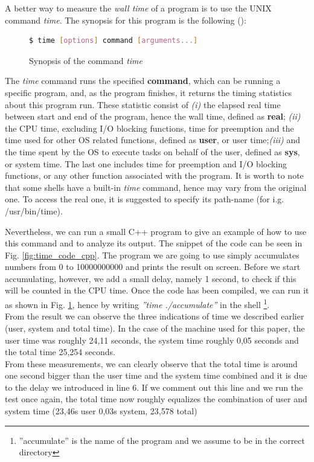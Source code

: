 A better way to measure the \textit{wall time} of a program is to use the UNIX command \textit{time}. The synopsis for this program is the following (\cite{linux_commands}):\\
\begin{figure}[h]
\begin{lstlisting}[language=bash]
   $ time [options] command [arguments...]
\end{lstlisting}
\caption{Synopsis of the command \textit{time}}
\label{fig:time_code}
\end{figure}


The \textit{time} command runs the specified \textbf{command}, which can be running a specific program, and, as the program finishes, it returns the timing statistics about this program run.
These statistic consist of \textit{(i)} the elapsed real time between start and end of the program, hence the wall time, defined as \textbf{real}; \textit{(ii)} the CPU time, excluding I/O blocking functions, time for preemption and the time used for other OS related functions, defined as \textbf{user}, or user time;\textit{(iii)} and the time spent by the OS to execute tasks on behalf of the user, defined as \textbf{sys}, or system time. The last one includes time for preemption and I/O blocking functions, or any other function associated with the program. \cite{Stewart2001MeasuringET}
It is worth to note that some shells have a built-in \textit{time} command, hence may vary from the original one. To access the real one, it is suggested to specify its path-name (for i.g. /usr/bin/time). \cite{linux_commands} 

Nevertheless, we can run a small C++ program to give an example of how to use this command and to analyze its output. The snippet of the code can be seen in Fig. \ref{fig:time_code_cpp}. The program we are going to use simply accumulates numbers from 0 to 10000000000 and prints the result on screen. Before we start accumulating, however, we add a small delay, namely 1 second, to check if this will be counted in the CPU time. Once the code has been compiled, we can run it as shown in Fig. \ref{fig:time_code}, hence by writing \textit{''time ./accumulate''} in the shell \footnote{''accumulate'' is the name of the program and we assume to be in the correct directory}.\\
From the result we can observe the three indications of time we described earlier (user, system and total time).  In the case of the machine used for this paper, the user time was roughly 24,11 seconds, the system time roughly 0,05 seconds and the total time 25,254 seconds. \\
From these measurements, we can clearly observe that the total time is around one second bigger than the user time and the system time combined and it is due to the delay we introduced in line 6. If we comment out this line and we run the test once again, the total time now roughly equalizes the combination of user and system time (23,46s user 0,03s system, 23,578 total)


